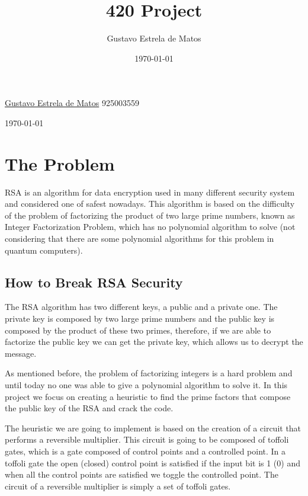 \documentclass[12pt]{article}
\title{420 Project}
\author{Gustavo Estrela de Matos}
\date{\today}
\begin{document}
\begin{titlepage}
\begin{center}
    \begin{flushleft}
        \textcolor{title_color} {
            \fontsize{2cm}{1em}\selectfont {Breaking the RSA with Reversible Multiplier Circuits\\}
        }
    \end{flushleft}
  
    \begin{flushleft}{
        \textcolor{text_color} {
        \href{mailto:estrela.gustavo.matos@gmail.com}{Gustavo Estrela de Matos} 925003559\\}
    }
    \end{flushleft}
    \today
\end{center}
\end{titlepage}

\newpage
\section{The Problem}
RSA is an algorithm for data encryption used in many different security system and considered one of safest nowadays. This algorithm is based on the difficulty of the problem of factorizing the product of two large prime numbers, known as Integer Factorization Problem, which has no polynomial algorithm to solve (not considering that there are some polynomial algorithms for this problem in quantum computers).

\subsection{How to Break RSA Security}
The RSA algorithm has two different keys, a public and a private one. The private key is composed by two large prime numbers and the public key is composed by the product of these two primes, therefore, if we are able to factorize the public key we can get the private key,  which allows us to decrypt the message.

As mentioned before, the problem of factorizing integers is a hard problem and until today no one was able to give a polynomial algorithm to solve it. In this project we focus on creating a heuristic to find the prime factors that compose the public key of the RSA and crack the code.

The heuristic we are going to implement is based on the creation of a circuit that performs a reversible multiplier. This circuit is going to be composed of toffoli gates, which is a gate composed of control points and a controlled point. In a toffoli gate the open (closed) control point is satisfied if the input bit is 1 (0) and when all the control points are satisfied we toggle the controlled point. The circuit of a reversible multiplier is simply a set of toffoli gates.
\end{document}
